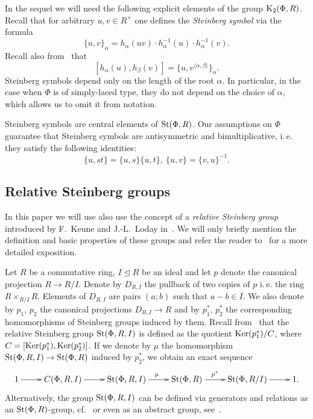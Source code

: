 In the sequel we will need the following explicit elements of the group $\operatorname{K}_2(\Phi, R)$.
Recall that for arbitrary $u, v \in R^\times$ one defines the \textit{Steinberg symbol} via the formula
\begin{equation} \label{eq:steinberg} \{ u, v \}_\alpha = h_\alpha(uv) \cdot h_\alpha^{-1}(u) \cdot h_\alpha^{-1}(v). \end{equation}
Recall also from~\cite[Lemme~5.4]{Ma69} that
\begin{equation} \label{eq:steinberg-2} [h_\alpha(u), h_\beta(v)] = \{u, v^{\langle \alpha, \beta \rangle}\}_\alpha. \end{equation}
Steinberg symbols depend only on the length of the root $\alpha$.
In particular, in the case when $\Phi$ is of simply-laced type, they do not depend on the choice of $\alpha$, which allows us to omit it from notation.

Steinberg symbols are central elements of $\operatorname{St}(\Phi, R)$.
Our assumptions on $\Phi$ guarantee that Steinberg symbols are antisymmetric and bimultiplicative, i.\,e. they satisfy the following identities:
\begin{equation} \label{eq:symbol-properties} \{ u, st \} = \{ u, s\} \{ u, t \}, \ \{ u, v \} = \{ v, u\}^{-1}. \end{equation}

\subsection{Relative Steinberg groups} \label{subsec:another-presentation}
In this paper we will use also use the concept of a \textit{relative Steinberg group} introduced by F.~Keune and J.-L.~Loday in~\cite{Ke78, Lo78}.
We will only briefly mention the definition and basic properties of these groups and refer the reader to~\cite[\S~2.3]{LS20} for a more detailed exposition.

Let $R$ be a commutative ring, $I \trianglelefteq R$ be an ideal and let $p$ denote the canonical projection $R \to R/I$.
Denote by $D_{R, I}$ the pullback of two copies of $p$ i.\,e. the ring $R \times_{R/I} R$.
Elements of $D_{R, I}$ are pairs $(a; b)$ such that $a-b \in I$.
We also denote by $p_1$, $p_2$ the canonical projections $D_{R, I} \to R$ and by $p_1^*$, $p_2^*$ the corresponding homomorphisms of Steinberg groups induced by them.
Recall from~\cite[Definition~2.5]{LS20} that the relative Steinberg group $\operatorname{St}(\Phi, R, I)$ is defined as the quotient
$\operatorname{Ker}(p_1^*) / C$, where $C = [\operatorname{Ker}(p_1^*), \operatorname{Ker}(p_2^*)]$.
If we denote by $\mu$ the homomorphism $\operatorname{St}(\Phi, R, I) \to \operatorname{St}(\Phi, R)$ induced by $p_2^*$, we obtain an exact sequence
\begin{equation}
    \xymatrix{1 \ar[r] & C(\Phi, R, I) \ar[r] & \St(\Phi, R, I) \ar[r]^\mu & \St(\Phi, R) \ar[r]^-{p^*} & \St(\Phi, R/I) \ar[r] & 1. }\label{eq:relative-Steinberg}
\end{equation}
Alternatively, the group $\operatorname{St}(\Phi, R, I)$ can be defined via generators and relations as an $\operatorname{St}(\Phi, R)$-group, cf.~\cite[Proposition~6]{S15}
or even as an abstract group, see~\cite{V22}.

